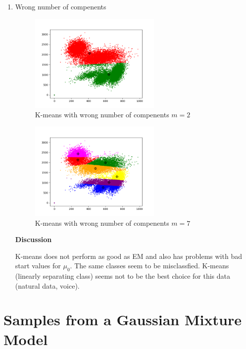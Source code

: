 \documentclass[12pt,a4paper]{article}
\begin{document}
\begin{enumerate}[start=2,label*={\arabic*.}]
\begin{enumerate}
  \end{enumerate}
  \item Wrong number of compenents

\begin{figure}[H]
  \centering
  \includegraphics[width=0.6\textwidth]{figures/2_0_m2.png}
	\caption{K-means with wrong number of compenents $m = 2$}
	\label{2_0_m2}
\end{figure}

\begin{figure}[H]
  \centering
  \includegraphics[width=0.6\textwidth]{figures/2_0_m7.png}
	\caption{K-means with wrong number of compenents $m = 7$}
	\label{2_0_m7}
\end{figure}

\textbf{Discussion}

K-means does not perform as good as EM and also has problems with bad start
values for $\mu_0$. The same classes seem to be misclassfied. K-means (linearly
separating class) seems not to be the best choice for this data (natural data,
voice).

\end{enumerate}

\newpage
\section{ Samples from a Gaussian Mixture Model}
\end{document}
